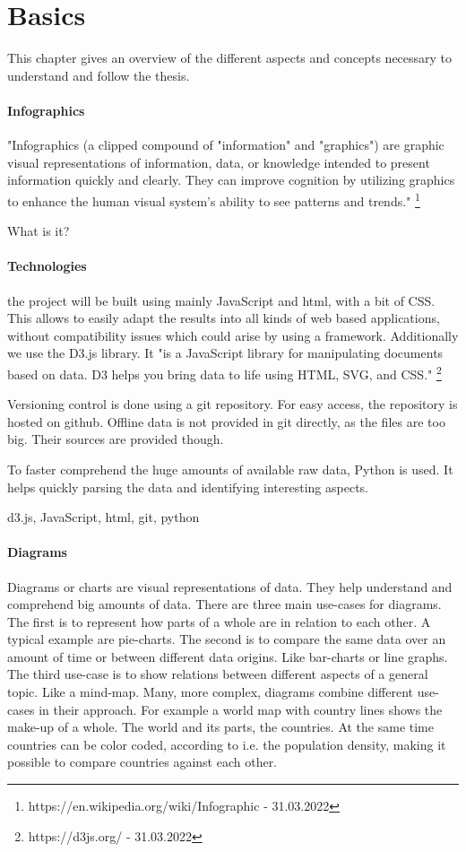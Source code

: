 \documentclass[
a4paper,     %
12pt         %
]{scrartcl}  %
\begin{document}
\section{Basics}
This chapter gives an overview of the different aspects and concepts necessary to understand and follow the thesis.

\paragraph{Infographics}
"Infographics (a clipped compound of "information" and "graphics") are graphic visual representations of information, data, or knowledge intended to present information quickly and clearly. They can improve cognition by utilizing graphics to enhance the human visual system's ability to see patterns and trends." \footnote{https://en.wikipedia.org/wiki/Infographic - 31.03.2022}

What is it?

\paragraph{Technologies}
the project will be built using mainly JavaScript and html, with a bit of CSS. This allows to easily adapt the results into all kinds of web based applications, without compatibility issues which could arise by using a framework. Additionally we use the D3.js library. It "is a JavaScript library for manipulating documents based on data. D3 helps you bring data to life using HTML, SVG, and CSS." \footnote{https://d3js.org/ - 31.03.2022}

Versioning control is done using a git repository. For easy access, the repository is hosted on github. Offline data is not provided in git directly, as the files are too big. Their sources are provided though.

To faster comprehend the huge amounts of available raw data, Python is used. It helps quickly parsing the data and identifying interesting aspects.

d3.js, JavaScript, html, git, python

\paragraph{Diagrams}
Diagrams or charts are visual representations of data. They help understand and comprehend big amounts of data.
There are three main use-cases for diagrams. The first is to represent how parts of a whole are in relation to each other. A typical example are pie-charts. The second is to compare the same data over an amount of time or between different data origins. Like bar-charts or line graphs. The third use-case is to show relations between different aspects of a general topic. Like a mind-map.
Many, more complex, diagrams combine different use-cases in their approach. For example a world map with country lines shows the make-up of a whole. The world and its parts, the countries. At the same time countries can be color coded, according to i.e. the population density, making it possible to compare countries against each other.
\end{document}
